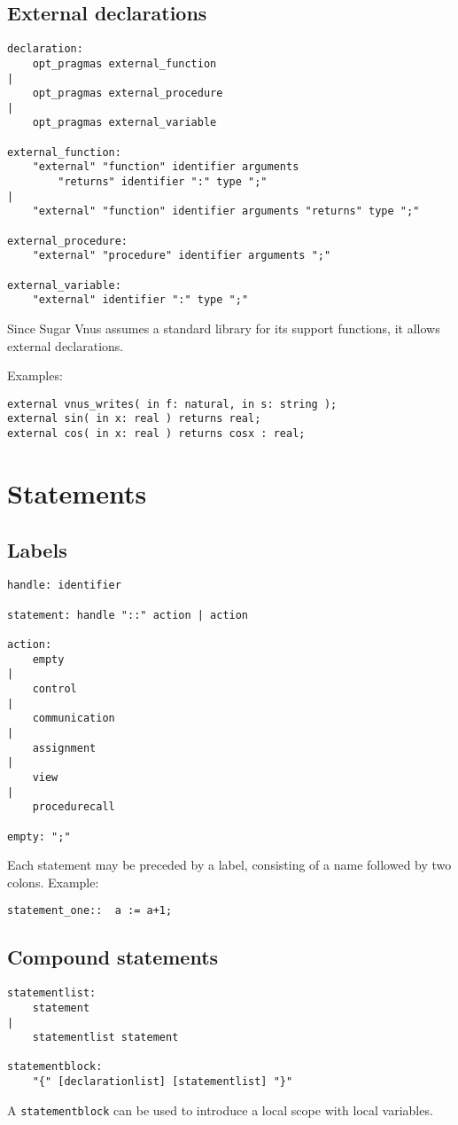 \documentclass[a4paper]{article}
\newcommand{\langnm}{Sugar Vnus}
\newcommand{\nonterm}[1]{{\tt #1}}
\begin{document}
\subsection{External declarations}
\begin{verbatim}
declaration:
    opt_pragmas external_function
|
    opt_pragmas external_procedure
|
    opt_pragmas external_variable

external_function:
    "external" "function" identifier arguments
        "returns" identifier ":" type ";"
|
    "external" "function" identifier arguments "returns" type ";"

external_procedure:
    "external" "procedure" identifier arguments ";"

external_variable:
    "external" identifier ":" type ";"
\end{verbatim}
Since {\langnm} assumes a standard library for its support functions,
it allows external declarations. 

Examples:
\begin{verbatim}
external vnus_writes( in f: natural, in s: string );
external sin( in x: real ) returns real;
external cos( in x: real ) returns cosx : real;
\end{verbatim}

\section{Statements}
\subsection{Labels}
\begin{verbatim}
handle: identifier

statement: handle "::" action | action

action:
    empty
|
    control
|
    communication
|
    assignment
|
    view
|
    procedurecall

empty: ";"
\end{verbatim}
Each statement may be preceded by a label, consisting of a name
followed by two colons.
Example:
\begin{verbatim}
statement_one::  a := a+1;
\end{verbatim}
\subsection{Compound statements}
\begin{verbatim}
statementlist:
    statement
|
    statementlist statement

statementblock:
    "{" [declarationlist] [statementlist] "}"
\end{verbatim}
A \nonterm{statementblock} can be used to introduce a local scope with
local variables.
\end{document}
